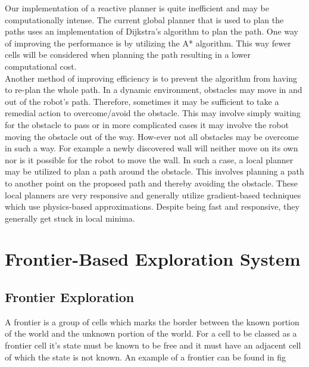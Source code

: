 \documentclass[a4paper,12pt]{article}
\begin{document}
			Our implementation of a reactive planner is quite inefficient and may be computationally intense. The current global planner that is used to plan the paths uses an implementation of Dijkstra's algorithm to plan the path. One way of improving the performance is by utilizing the A* algorithm. This way fewer cells will be considered when planning the path resulting in a lower computational cost.
			\\
			Another method of improving efficiency is to prevent the algorithm from having to re-plan the whole path. In a dynamic environment, obstacles may move in and out of the robot's path. Therefore, sometimes it may be sufficient to take a remedial action to overcome/avoid the obstacle. This may involve simply waiting for the obstacle to pass or in more complicated cases it may involve the robot moving the obstacle out of the way. How-ever not all obstacles may be overcome in such a way. For example a newly discovered wall will neither move on its own nor is it possible for the robot to move the wall. In such a case, a local planner may be utilized to plan a path around the obstacle. This involves planning a path to another point on the proposed path and thereby avoiding the obstacle. These local planners are very responsive and generally utilize gradient-based techniques which use physics-based approximations. Despite being fast and responsive, they generally get stuck in local minima. 
			
	
	\section{Frontier-Based Exploration System}

		\subsection{Frontier Exploration}

			A frontier is a group of cells which marks the border between the known portion of the world and the unknown portion of the world. For a cell to be classed as a frontier cell it's state must be known to be free and it must have an adjacent cell of which the state is not known. An example of a frontier can be found in fig
\end{document}
